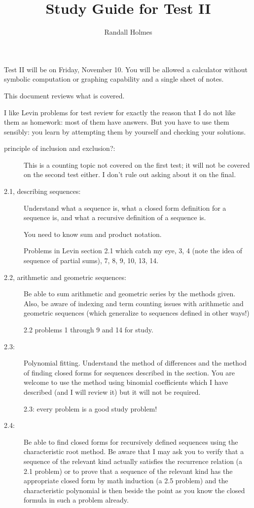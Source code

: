 \documentclass[12pt]{article}
\title{Study Guide for Test II}
\author{Randall Holmes}
\begin{document}
\maketitle

Test II will be on Friday, November 10.  You will be allowed a calculator without symbolic computation or graphing capability and a single sheet of notes.

This document reviews what is covered.

I like Levin problems for test review for exactly the reason that I do not like them as homework:  most of them have answers.  But you have to use them sensibly:  you learn by attempting them by yourself and checking your solutions.

\begin{description}

\item[principle of inclusion and exclusion?:]  This is a counting topic not covered on the first test;  it will not be covered on the second test either.  I don't rule out asking about it on the final.

\item[2.1, describing sequences:]  Understand what a sequence is, what a closed form definition for a sequence is, and what a recursive definition of a sequence is.

You need to know sum and product notation.

Problems in Levin section 2.1 which catch my eye, 3, 4 (note the idea of sequence of partial sums), 7, 8, 9, 10, 13, 14.

\item[2.2, arithmetic and geometric sequences:]  Be able to sum arithmetic and geometric series by the methods given.  Also, be aware of indexing and term counting issues with arithmetic and geometric sequences (which generalize to sequences defined in other ways!)

2.2 problems 1 through 9 and 14 for study.

\item[2.3:]  Polynomial fitting.   Understand the method of differences and the method of finding closed forms for sequences described in the section.
You are welcome to use the method using binomial coefficients which I have described (and I will review it) but it will not be required.

2.3:  every problem is a good study problem!

\item[2.4:]  Be able to find closed forms for recursively defined sequences using the characteristic root method.  Be aware that I may ask you to verify that a sequence of the relevant kind actually satisfies the recurrence relation (a 2.1 problem) or to prove that a sequence of the relevant kind has the appropriate closed form by math induction (a 2.5 problem) and the characteristic polynomial is then beside the point as you know the closed formula in such a problem already.


\end{description}
\end{document}

